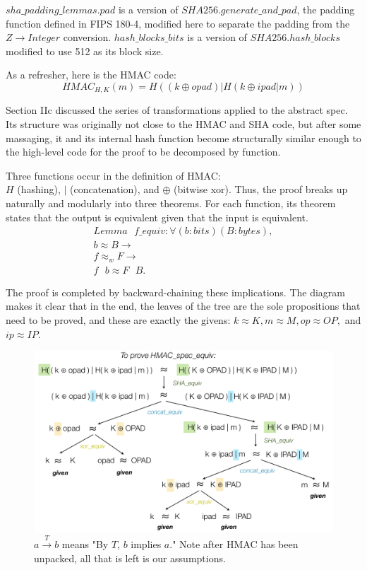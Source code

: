 \documentclass[twocolumn,showpacs,%
  nofootinbib,aps,superscriptaddress,%
  eqsecnum,prd,notitlepage,showkeys,10pt]{revtex4-1}
\newcommand{\eqn}[1] {\begin{gather*}#1\end{gather*}}
\newcommand{\spc} {\textrm{ }}
\newcommand{\s} {\textrm{ }}
\begin{document}
$sha\_padding\_lemmas.pad$ is a version of $SHA256.generate\_and\_pad$, the padding function defined in FIPS 180-4, modified here to separate the padding from the $Z \rightarrow Integer$ conversion. $hash\_blocks\_bits$ is a version of $SHA256.hash\_blocks$ modified to use 512 as its block size. 	

As a refresher, here is the HMAC code:
$$HMAC_{H, K}(m) = H ( (k \oplus opad) | H ( k \oplus ipad | m )  ) $$

Section IIc discussed the series of transformations applied to the abstract spec. Its structure was originally not close to the HMAC and SHA code, but after some massaging, it and its internal hash function become structurally similar enough to the high-level code for the proof to be  decomposed by function.

Three functions occur in the definition of HMAC: \\ $H$ (hashing), $|$ (concatenation), and $\oplus$ (bitwise xor). Thus, the proof breaks up naturally and modularly into three theorems. For each function, its theorem states that the output is equivalent given that the input is equivalent. 
\eqn{
Lemma \s f\_equiv : \forall (b : bits) (B : bytes), \\
b \approx B \rightarrow  \\
f \approx_w F \rightarrow \\
f \spc b \approx F \spc B.}

The proof is completed by backward-chaining these implications. The diagram makes it clear that in the end, the leaves of the tree are the sole propositions that need to be proved, and these are exactly the givens: $k \approx K, m \approx M, op \approx OP,$ and $ip \approx IP$.

 \begin{figure}[h!]
 	\centering
 	\includegraphics[scale=0.21]{HMAC_spec_equiv}
 	\caption{$a \xrightarrow{T} b$ means "By $T$, $b$ implies $a$." Note after HMAC has been unpacked, all that is left is our assumptions.}
 \end{figure}
\end{document}
